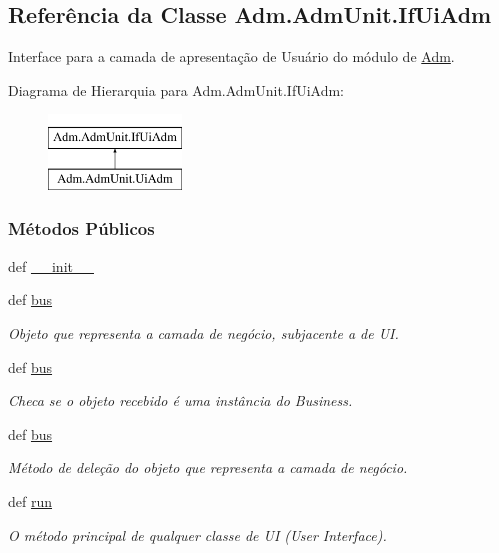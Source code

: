 \hypertarget{classAdm_1_1AdmUnit_1_1IfUiAdm}{\subsection{Referência da Classe Adm.\-Adm\-Unit.\-If\-Ui\-Adm}
\label{classAdm_1_1AdmUnit_1_1IfUiAdm}
}


Interface para a camada de apresentação de Usuário do módulo de \hyperlink{namespaceAdm}{Adm}.  


Diagrama de Hierarquia para Adm.\-Adm\-Unit.\-If\-Ui\-Adm\-:\begin{figure}[H]
\begin{center}
\leavevmode
\includegraphics[height=2.000000cm]{d7/d07/classAdm_1_1AdmUnit_1_1IfUiAdm}
\end{center}
\end{figure}
\subsubsection*{Métodos Públicos}
\begin{DoxyCompactItemize}
\item 
def \hyperlink{classAdm_1_1AdmUnit_1_1IfUiAdm_ab37924016cd115531c85439dc82f5ea3}{\-\_\-\-\_\-init\-\_\-\-\_\-}
\item 
def \hyperlink{classAdm_1_1AdmUnit_1_1IfUiAdm_a4863c3ebab6e5fac647ab32415153470}{bus}
\begin{DoxyCompactList}\small\item\em Objeto que representa a camada de negócio, subjacente a de U\-I. \end{DoxyCompactList}\item 
def \hyperlink{classAdm_1_1AdmUnit_1_1IfUiAdm_a4863c3ebab6e5fac647ab32415153470}{bus}
\begin{DoxyCompactList}\small\item\em Checa se o objeto recebido é uma instância do Business. \end{DoxyCompactList}\item 
def \hyperlink{classAdm_1_1AdmUnit_1_1IfUiAdm_a4863c3ebab6e5fac647ab32415153470}{bus}
\begin{DoxyCompactList}\small\item\em Método de deleção do objeto que representa a camada de negócio. \end{DoxyCompactList}\item 
def \hyperlink{classAdm_1_1AdmUnit_1_1IfUiAdm_ad2879ed80544aa2a153c7eeed3a09a52}{run}
\begin{DoxyCompactList}\small\item\em O método principal de qualquer classe de U\-I (User Interface). \end{DoxyCompactList}\end{DoxyCompactItemize}

